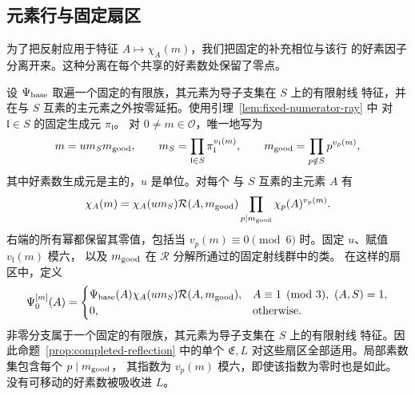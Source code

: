 \subsection{元素行与固定扇区}

为了把反射应用于特征 $A\mapsto\chi_A(m)$，我们把固定的补充相位与该行
的好素因子分离开来。这种分离在每个共享的好素数处保留了零点。

\begin{lemma}[非零行的固定射线扇区]
\label{lem:reflection-row-sectors}
设 $\Psi_{\rm base}$ 取遍一个固定的有限族，其元素为导子支集在 $S$ 上的有限射线
特征，并在与 $S$ 互素的主元素之外按零延拓。使用引理~\ref{lem:fixed-numerator-ray} 中
对 $\mathfrak l\in S$ 的固定生成元 $\pi_{\mathfrak l}$。
对 $0\ne m\in\mathcal O$，唯一地写为
\[
 m=u m_Sm_{\rm good},\qquad
 m_S=\prod_{\mathfrak l\in S}\pi_{\mathfrak l}^{v_{\mathfrak l}(m)},\qquad
 m_{\rm good}=\prod_{p\notin S}p^{v_p(m)},
\]
其中好素数生成元是主的，$u$ 是单位。对每个
与 $S$ 互素的主元素 $A$ 有
\begin{equation}\label{eq:reflection-row-reduction}
 \chi_A(m)=\chi_A(u m_S)\mathcal R(A,m_{\rm good})
       \prod_{p\mid m_{\rm good}}\chi_p(A)^{v_p(m)}.
\end{equation}
右端的所有幂都保留其零值，包括当
$v_p(m)\equiv0\pmod6$ 时。固定 $u$、赋值 $v_{\mathfrak l}(m)$ 模六，
以及 $m_{\rm good}$ 在 $\mathcal R$ 分解所通过的固定射线群中的类。
在这样的扇区中，定义
\begin{equation}\label{eq:reflection-sector-character}
 \Psi_0^{[m]}(A)=
 \begin{cases}
 \Psi_{\rm base}(A)\chi_A(u m_S)\mathcal R(A,m_{\rm good}),
       &A\equiv1\pmod3,\ (A,S)=1,\\
 0,&\text{otherwise}.
 \end{cases}
\end{equation}
非零分支属于一个固定的有限族，其元素为导子支集在 $S$ 上的有限射线
特征。因此命题~\ref{prop:completed-reflection} 中的单个
$\mathfrak E,L$ 对这些扇区全部适用。局部素数集包含每个 $p\mid m_{\rm good}$，
其指数为 $v_p(m)$ 模六，即使该指数为零时也是如此。
没有可移动的好素数被吸收进 $L$。
\end{lemma}

